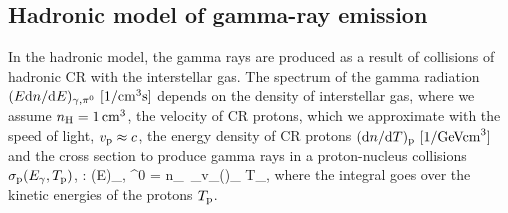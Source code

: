 







\subsection{Hadronic model of gamma-ray emission}
\label{sec:Pion_model}

In the hadronic model, the gamma rays are produced as a result of collisions of hadronic CR with the interstellar gas.
The spectrum of the gamma radiation $(E \text{d} n / \text{d} E)_{\gamma,\pi^0}\ [\SI{}{1/cm^3s}]$ depends on the density of interstellar gas, where we assume $n_{\text{H}} = \SI{1}{/cm^3}$, the velocity of CR protons, which we approximate with the speed of light, $v_{\text{p}} \approx c$, the energy density of CR protons $(\text{d} n / \text{d} T)_{\text{p}}\ [\SI{}{1/GeVcm^3}]$ and the cross section to produce gamma rays in a proton-nucleus collisions $\sigma_{\text{p}} (E_\gamma, T_{\text{p}})$, :
\be
\left(E\right)_{\!\!\gamma, \pi^0}\! = \int n_\Hy\ \sigma_\pr v_\pr \left(\right)_{\!\!\pr} \de T_\pr,
\ee
where the integral goes over the kinetic energies of the protons $T_{\text{p}}$. 